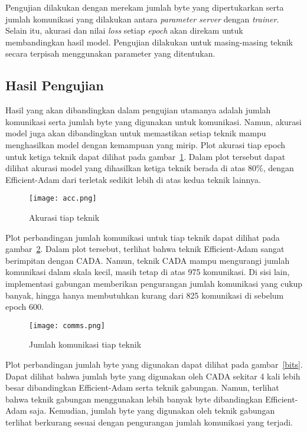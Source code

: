 Pengujian dilakukan dengan merekam jumlah byte yang dipertukarkan serta jumlah komunikasi yang dilakukan antara \emph{parameter server} dengan \emph{trainer}. Selain itu, akurasi dan nilai \emph{loss} setiap \emph{epoch} akan direkam untuk membandingkan hasil model. Pengujian dilakukan untuk masing-masing teknik secara terpisah menggunakan parameter yang ditentukan.

\subsection{Hasil Pengujian}

Hasil yang akan dibandingkan dalam pengujian utamanya adalah jumlah komunikasi serta jumlah byte yang digunakan untuk komunikasi. Namun, akurasi model juga akan dibandingkan untuk memastikan setiap teknik mampu menghasilkan model dengan kemampuan yang mirip. Plot akurasi tiap epoch untuk ketiga teknik dapat dilihat pada gambar~\ref{acc}. Dalam plot tersebut dapat dilihat akurasi model yang dihasilkan ketiga teknik berada di atas 80\%, dengan Efficient-Adam dari \textcite{Chen2022Efficient} terletak sedikit lebih di atas kedua teknik lainnya.

\begin{figure}[ht]
  \centering
  \texttt{[image: acc.png]}
  \caption{Akurasi tiap teknik}\label{acc}
\end{figure}

Plot perbandingan jumlah komunikasi untuk tiap teknik dapat dilihat pada gambar~\ref{comms}. Dalam plot tersebut, terlihat bahwa teknik Efficient-Adam sangat berimpitan dengan CADA. Namun, teknik CADA mampu mengurangi jumlah komunikasi dalam skala kecil, masih tetap di atas 975 komunikasi. Di sisi lain, implementasi gabungan memberikan pengurangan jumlah komunikasi yang cukup banyak, hingga hanya membutuhkan kurang dari 825 komunikasi di sebelum epoch 600.

\begin{figure}[ht]
  \centering
  \texttt{[image: comms.png]}
  \caption{Jumlah komunikasi tiap teknik}\label{comms}
\end{figure}

Plot perbandingan jumlah byte yang digunakan dapat dilihat pada gambar~\ref{bits}. Dapat dilihat bahwa jumlah byte yang digunakan oleh CADA sekitar 4 kali lebih besar dibandingkan Efficient-Adam serta teknik gabungan. Namun, terlihat bahwa teknik gabungan menggunakan lebih banyak byte dibandingkan Efficient-Adam saja. Kemudian, jumlah byte yang digunakan oleh teknik gabungan terlihat berkurang sesuai dengan pengurangan jumlah komunikasi yang terjadi.

